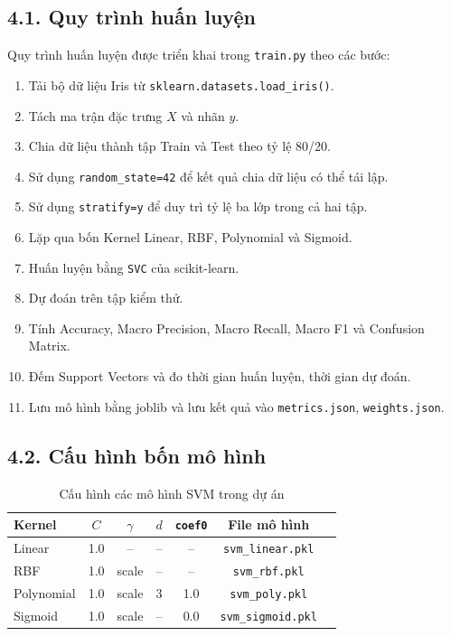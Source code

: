 \documentclass{article}
\begin{document}
	\subsection{4.1. Quy trình huấn luyện}
	\hspace{0.5cm}
	Quy trình huấn luyện được triển khai trong \texttt{train.py} theo các bước:
	\begin{enumerate}
		\item Tải bộ dữ liệu Iris từ \texttt{sklearn.datasets.load\_iris()}.
		\item Tách ma trận đặc trưng $X$ và nhãn $y$.
		\item Chia dữ liệu thành tập Train và Test theo tỷ lệ 80/20.
		\item Sử dụng \texttt{random\_state=42} để kết quả chia dữ liệu có thể tái lập.
		\item Sử dụng \texttt{stratify=y} để duy trì tỷ lệ ba lớp trong cả hai tập.
		\item Lặp qua bốn Kernel Linear, RBF, Polynomial và Sigmoid.
		\item Huấn luyện bằng \texttt{SVC} của scikit-learn.
		\item Dự đoán trên tập kiểm thử.
		\item Tính Accuracy, Macro Precision, Macro Recall, Macro F1 và Confusion Matrix.
		\item Đếm Support Vectors và đo thời gian huấn luyện, thời gian dự đoán.
		\item Lưu mô hình bằng joblib và lưu kết quả vào \texttt{metrics.json}, \texttt{weights.json}.
	\end{enumerate}
	
	\subsection{4.2. Cấu hình bốn mô hình}
	
	\begin{table}[H]
		\centering
		\caption{Cấu hình các mô hình SVM trong dự án}
		\label{tab:svmconfig}
		\small
		\begin{tabular}{lcccccc}
			\toprule
			\textbf{Kernel} & $C$ & $\gamma$ & $d$ & \texttt{coef0} & \textbf{File mô hình}\\
			\midrule
		Linear & 1.0 & -- & -- & -- & \texttt{svm\_linear.pkl}\\
		RBF & 1.0 & scale & -- & -- & \texttt{svm\_rbf.pkl}\\
		Polynomial & 1.0 & scale & 3 & 1.0 & \texttt{svm\_poly.pkl}\\
		Sigmoid & 1.0 & scale & -- & 0.0 & \texttt{svm\_sigmoid.pkl}\\
			\bottomrule
		\end{tabular}
	\end{table}
	
\end{document}
